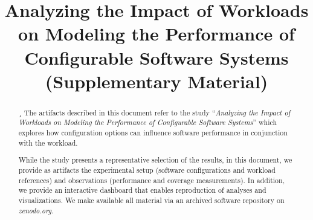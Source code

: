 \documentclass[10pt,conference]{IEEEtran}
\begin{document}
	
	\title{Analyzing the Impact of Workloads on Modeling the Performance of Configurable Software Systems (Supplementary Material)}
	
	\author{
		\centering
		\and
		\and
		\and
		\and
		\linebreakand
		\and
	}
	
	
	\maketitle
	
	
	\maketitle
	\setcounter{tocdepth}{4}
	
	\begin{abstract}¸
	The artifacts described in this document refer to the study ``\textit{Analyzing the Impact of Workloads on Modeling the Performance of Configurable Software Systems}'' which explores how configuration options can influence software performance in conjunction with the workload.
	
	While the study presents a representative selection of the results, in this document, we provide as artifacts the experimental setup (software configurations and workload references) and observations (performance and coverage measurements). In addition, we provide an interactive dashboard that enables reproduction of analyses and visualizations. We make available all material via an archived software repository on \textit{zenodo.org}.
	\end{abstract}
\end{document}

